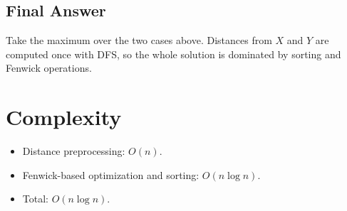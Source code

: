 \documentclass[11pt,a4paper]{article}
\begin{document}
\subsection{Final Answer}
Take the maximum over the two cases above. Distances from $X$ and $Y$ are computed once with DFS, so the whole solution is dominated by sorting and Fenwick operations.

\section{Complexity}
\begin{itemize}
  \item Distance preprocessing: $O(n)$.
  \item Fenwick-based optimization and sorting: $O(n \log n)$.
  \item Total: $O(n \log n)$.
\end{itemize}
\end{document}
